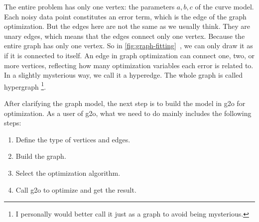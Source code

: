 The entire problem has only one vertex: the parameters $a, b, c$ of the curve model. Each noisy data point constitutes an error term, which is the edge of the graph optimization. But the edges here are not the same as we usually think. They are unary edges, which means that the edges connect only one vertex. Because the entire graph has only one vertex. So in \autoref{fig:graph-fitting}~, we can only draw it as if it is connected to itself. An edge in graph optimization can connect one, two, or more vertices, reflecting how many optimization variables each error is related to. In a slightly mysterious way, we call it a hyperedge. The whole graph is called hypergraph \footnote{I personally would better call it just as a graph to avoid being mysterious. }.

After clarifying the graph model, the next step is to build the model in g2o for optimization. As a user of g2o, what we need to do mainly includes the following steps:
\begin{enumerate}
    \item Define the type of vertices and edges.
    \item Build the graph.
    \item Select the optimization algorithm.
    \item Call g2o to optimize and get the result.
\end{enumerate}

